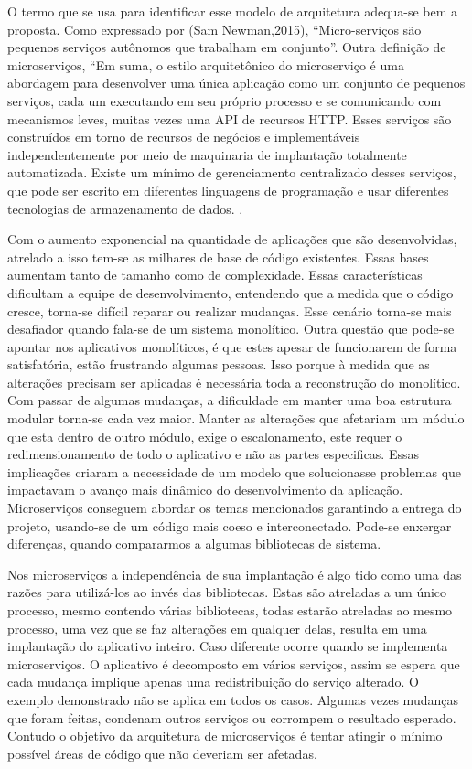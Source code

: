 O termo que se usa para identificar esse modelo de arquitetura adequa-se bem a proposta. Como expressado por (Sam Newman,2015), “Micro-serviços são pequenos serviços autônomos que trabalham em conjunto”. Outra definição de microserviços, “Em suma, o estilo arquitetônico do microserviço é uma abordagem para desenvolver uma única aplicação como um conjunto de pequenos serviços, cada um executando em seu próprio processo e se comunicando com mecanismos leves, muitas vezes uma API de recursos HTTP. Esses serviços são construídos em torno de recursos de negócios e implementáveis independentemente por meio de maquinaria de implantação totalmente automatizada. Existe um mínimo de gerenciamento centralizado desses serviços, que pode ser escrito em diferentes linguagens de programação e usar diferentes tecnologias de armazenamento de dados. \cite{martin-fowler-microservices}.


Com o aumento exponencial na quantidade de aplicações que são desenvolvidas, atrelado a isso tem-se as milhares de base de código existentes. Essas bases aumentam tanto de tamanho como de complexidade. Essas características dificultam a equipe de desenvolvimento, entendendo que a medida que o código cresce, torna-se difícil reparar ou realizar mudanças. Esse cenário torna-se mais desafiador quando fala-se de um sistema monolítico. Outra questão que pode-se apontar nos aplicativos monolíticos, é que estes apesar de funcionarem de forma satisfatória, estão frustrando algumas pessoas.  Isso porque à medida que as alterações precisam ser aplicadas é necessária toda a reconstrução do monolítico. Com passar de algumas mudanças, a dificuldade em manter uma boa estrutura modular torna-se cada vez maior. Manter as alterações que  afetariam um módulo que esta dentro de outro módulo, exige o escalonamento, este requer o redimensionamento de todo o aplicativo e não as partes especificas. Essas implicações criaram a necessidade de um modelo que solucionasse problemas que impactavam o avanço mais dinâmico do desenvolvimento da aplicação.
Microserviços conseguem abordar os temas mencionados garantindo a entrega do projeto, usando-se de um código mais coeso e interconectado.  Pode-se enxergar diferenças, quando compararmos a algumas bibliotecas de sistema.


Nos microserviços a independência de sua implantação é algo tido como uma das razões para utilizá-los ao invés das bibliotecas. Estas são atreladas a um único processo, mesmo contendo várias bibliotecas, todas estarão atreladas ao mesmo processo, uma vez que se faz alterações em qualquer delas, resulta em uma implantação do aplicativo inteiro. Caso diferente ocorre quando se implementa microserviços. O aplicativo é decomposto em vários serviços, assim se espera que cada mudança implique apenas uma redistribuição do serviço alterado. O exemplo demonstrado não se aplica em todos os casos. Algumas vezes mudanças que foram feitas, condenam outros serviços ou corrompem o resultado esperado. Contudo o objetivo da arquitetura de microserviços é tentar atingir o mínimo possível áreas de código que não deveriam ser afetadas.


